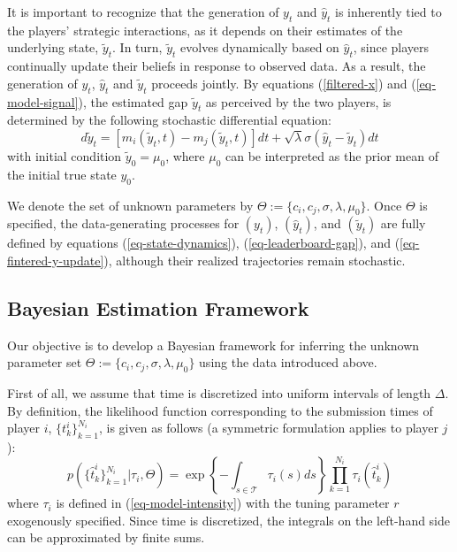 \documentclass[mnsc]{informs3}
\begin{document}
It is important to recognize that the generation of $y_t$ and $\hat{y}_t$ is inherently tied to the players’ strategic interactions, as it depends on their estimates of the underlying state, $\tilde{y}_t$. 
In turn, $\tilde{y}_t$ evolves dynamically based on $\hat{y}_t$, since players continually update their beliefs in response to observed data. 
As a result, the generation of $y_t$, $\hat{y}_t$ and $\tilde{y}_t$ proceeds jointly.
By equations (\ref{filtered-x}) and (\ref{eq-model-signal}), the estimated gap $\tilde{y}_t$ as perceived by the two players, is determined by the following stochastic differential equation:
\begin{equation}\label{eq-fintered-y-update}
d\tilde{y}_{t} = \left[m_i(\tilde{y}_t, t) - m_j(\tilde{y}_t, t)\right]dt + \sqrt{\lambda}\sigma(\hat{y}_t-\tilde{y}_{t}) dt
\end{equation}
with initial condition $\tilde{y}_0 = \mu_0$, where $\mu_0$ can be interpreted as the prior mean of the initial true state $y_0$.

We denote the set of unknown parameters by $\Theta := \{c_i, c_j, \sigma, \lambda, \mu_0\}$.
Once $\Theta$ is specified, the data-generating processes for $(y_t)$, $(\hat{y}_t)$, and $(\tilde{y}_t)$ are fully defined by equations (\ref{eq-state-dynamics}), (\ref{eq-leaderboard-gap}), and (\ref{eq-fintered-y-update}), although their realized trajectories remain stochastic.


\subsection{Bayesian Estimation Framework}

Our objective is to develop a Bayesian framework for inferring the unknown parameter set $\Theta := \{ c_i, c_j, \sigma, \lambda, \mu_0 \}$ using the data introduced above.

First of all, we assume that time is discretized into uniform intervals of length $\Delta$.
By definition, the likelihood function corresponding to the submission times of player $i$, $\{t^i_k\}_{k=1}^{N_i}$, is given as follows (a symmetric formulation applies to player $j$):
\begin{equation}\label{eq-ihpp-prob}
p\left(\{\hat{t}^i_k\}_{k=1}^{N_i} | \tau_i, \Theta\right) = \exp\left\{-\int_{s\in\mathcal{T}}\tau_i(s)ds\right\}\prod_{k=1}^{N_i}\tau_i(\hat{t}^i_k)
\end{equation}
where $\tau_i$ is defined in (\ref{eq-model-intensity}) with the tuning parameter $r$ exogenously specified. 
Since time is discretized, the integrals on the left-hand side can be approximated by finite sums.
\end{document}
